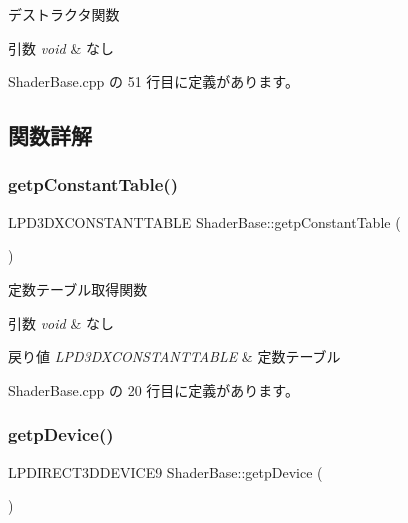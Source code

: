 デストラクタ関数 


\begin{DoxyParams}{引数}
{\em void} & なし \\
\hline
\end{DoxyParams}


 Shader\+Base.\+cpp の 51 行目に定義があります。



\subsection{関数詳解}
\mbox{\label{class_shader_base_a89f6e1ba14f7db57248c794356f9b076}} 
\subsubsection{\texorpdfstring{getp\+Constant\+Table()}{getpConstantTable()}}
{\footnotesize\ttfamily L\+P\+D3\+D\+X\+C\+O\+N\+S\+T\+A\+N\+T\+T\+A\+B\+LE Shader\+Base\+::getp\+Constant\+Table (\begin{DoxyParamCaption}{ }\end{DoxyParamCaption})}



定数テーブル取得関数 


\begin{DoxyParams}{引数}
{\em void} & なし \\
\hline
\end{DoxyParams}

\begin{DoxyRetVals}{戻り値}
{\em L\+P\+D3\+D\+X\+C\+O\+N\+S\+T\+A\+N\+T\+T\+A\+B\+LE} & 定数テーブル \\
\hline
\end{DoxyRetVals}


 Shader\+Base.\+cpp の 20 行目に定義があります。

\mbox{\label{class_shader_base_aa16d631f799060854de36a024dcfce48}} 
\subsubsection{\texorpdfstring{getp\+Device()}{getpDevice()}}
{\footnotesize\ttfamily L\+P\+D\+I\+R\+E\+C\+T3\+D\+D\+E\+V\+I\+C\+E9 Shader\+Base\+::getp\+Device (\begin{DoxyParamCaption}{ }\end{DoxyParamCaption})}



